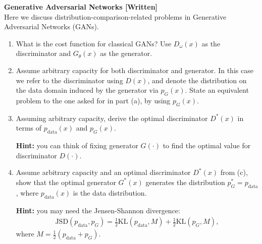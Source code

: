 \begin{Q}
\textbf{\Large Generative Adversarial Networks [Written]}\\

Here we discuss distribution-comparison-related problems in Generative Adversarial Networks (GANs).

\begin{enumerate}
	\item What is the cost function for classical GANs? Use $D_{\omega} (x)$ as the discriminator and $G_\theta(x)$ as the generator.
	
	\item Assume arbitrary capacity for both discriminator and generator. In this case we refer to the discriminator using $D(x)$, and denote the distribution on the data domain induced by the generator via $p_G (x)$. State an equivalent problem to the one asked for in part (a), by using $p_G (x)$.
	
	\item Assuming arbitrary capacity, derive the optimal discriminator $D^\ast(x)$ in terms of $p_\text{data}(x)$ and $p_G(x)$.
	
	\textbf{Hint:} you can think of fixing generator $G(\cdot)$ to find the optimal value for discriminator $D(\cdot)$.
	
	
	
	
	\item Assume arbitrary capacity and an optimal discriminator $D^\ast(x)$ from (c), show that the optimal generator $G^\ast(x)$ generates the distribution $p^\ast_G = p_\text{data}$, where $p_\text{data}(x)$ is the data distribution.
	
	\textbf{Hint:} you may need the Jensen-Shannon divergence:
	\begin{align*}
		\text{JSD}(p_\text{data}, p_G) = \frac{1}{2} \text{KL}(p_\text{data}, M) + \frac{1}{2} \text{KL}(p_G, M),
	\end{align*}
	where $M = \frac{1}{2} (p_\text{data} + p_G)$.
	

\end{enumerate}
\end{Q}
